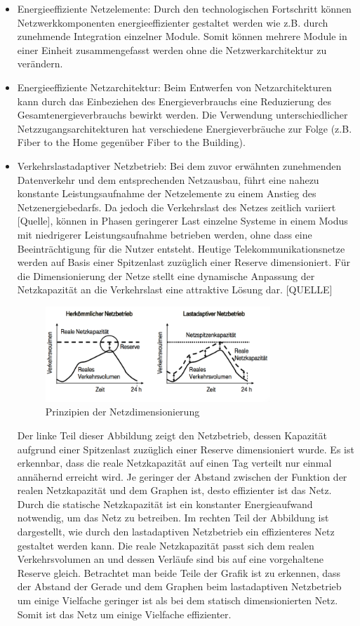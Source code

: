 \documentclass[12pt,titlepage]{article}
\begin{document}
\begin{itemize}
	\item Energieeffiziente Netzelemente: Durch den technologischen Fortschritt können Netzwerkkomponenten energieeffizienter gestaltet werden wie z.B. durch zunehmende Integration einzelner Module. Somit können mehrere Module in einer Einheit zusammengefasst werden ohne die Netzwerkarchitektur zu verändern. 
	\item Energieeffiziente Netzarchitektur: Beim Entwerfen von Netzarchitekturen kann durch das Einbeziehen des Energieverbrauchs eine Reduzierung des Gesamtenergieverbrauchs bewirkt werden.  Die Verwendung unterschiedlicher Netzzugangsarchitekturen hat verschiedene Energieverbräuche zur Folge (z.B. Fiber to the Home gegenüber Fiber to the Building).
	\item Verkehrslastadaptiver Netzbetrieb: Bei dem zuvor erwähnten zunehmenden Datenverkehr und dem entsprechenden Netzausbau, führt eine nahezu konstante Leistungsaufnahme der Netzelemente zu einem Anstieg des Netzenergiebedarfs. Da jedoch die Verkehrslast des Netzes zeitlich variiert [Quelle], können in Phasen geringerer Last einzelne Systeme in einem Modus mit niedrigerer Leistungsaufnahme betrieben werden, ohne dass eine Beeinträchtigung für die Nutzer entsteht. Heutige Telekommunikationsnetze werden auf Basis einer Spitzenlast zuzüglich einer Reserve dimensioniert. Für die Dimensionierung der Netze stellt eine dynamische Anpassung der Netzkapazität an die Verkehrslast eine attraktive Lösung dar. [QUELLE]
\begin{figure}[!ht]
	\centering
	\includegraphics[width=0.8\textwidth]{Netzdimensionierung}
	\caption{Prinzipien der Netzdimensionierung}
	\label{fig:Netzdimensionierung}
\end{figure}
Der linke Teil dieser Abbildung zeigt den Netzbetrieb, dessen Kapazität aufgrund einer Spitzenlast zuzüglich einer Reserve dimensioniert wurde. Es ist erkennbar, dass die reale Netzkapazität auf einen Tag verteilt nur einmal annähernd erreicht wird. Je geringer der Abstand zwischen der Funktion der realen Netzkapazität und dem Graphen ist, desto effizienter ist das Netz. Durch die statische Netzkapazität ist ein konstanter Energieaufwand notwendig, um das Netz zu betreiben. Im rechten Teil der Abbildung ist dargestellt, wie durch den lastadaptiven Netzbetrieb ein effizienteres Netz gestaltet werden kann. Die reale Netzkapazität passt sich dem realen Verkehrsvolumen an und dessen Verläufe sind bis auf eine vorgehaltene Reserve gleich. Betrachtet man beide Teile der Grafik ist zu erkennen, dass der Abstand der Gerade und dem Graphen beim lastadaptiven Netzbetrieb um einige Vielfache geringer ist als bei dem statisch dimensionierten Netz. Somit ist das Netz um einige Vielfache effizienter. 
\end{itemize}
\end{document}
